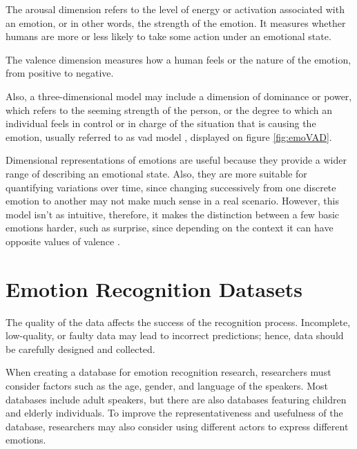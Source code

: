 The arousal dimension refers to the level of energy or activation associated with an emotion, or in other words, the strength of the emotion. It measures whether humans are more or less likely to take some action under an emotional state.

The valence dimension measures how a human feels or the nature of the emotion, from positive to negative.

Also, a three-dimensional model may include a dimension of dominance or power, which refers to the seeming strength of the person, or the degree to which an individual feels in control or in charge of the situation that is causing the emotion, usually referred to as \ac{vad} model \cite{RUSSELL1977273}, displayed on figure \ref{fig:emoVAD}.


Dimensional representations of emotions are useful because they provide a wider range of describing an emotional state. Also, they are more suitable for quantifying variations over time, since changing successively from one discrete emotion to another may not make much sense in a real scenario. However, this model isn't as intuitive, therefore, it makes the distinction between a few basic emotions harder, such as surprise, since depending on the context it can have opposite values of valence \cite{Shuman2015}.

\section{Emotion Recognition Datasets}

The quality of the data affects the success of the recognition process. Incomplete, low-quality, or faulty data may lead to incorrect predictions; hence, data should be carefully designed and collected. 

When creating a database for emotion recognition research, researchers must consider factors such as the age, gender, and language of the speakers. Most databases include adult speakers, but there are also databases featuring children and elderly individuals. To improve the representativeness and usefulness of the database, researchers may also consider using different actors to express different emotions.

